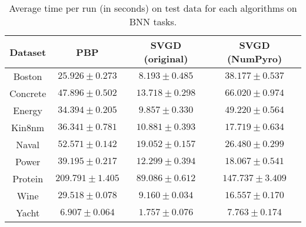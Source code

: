 \begin{table}[h]
\centering
\begin{tabular}{|c|ccc|}
\hline
 Dataset & PBP & SVGD (original) & SVGD (NumPyro)  \\
 \hline
Boston & $25.926 \pm 0.273$ & $8.193 \pm 0.485$ & $38.177 \pm 0.537$ \\
Concrete & $47.896 \pm 0.502$ & $13.718 \pm 0.298$ & $66.020 \pm 0.974$ \\
Energy & $34.394 \pm 0.205$ & $9.857 \pm 0.330$ & $49.220 \pm 0.564$ \\
Kin8nm & $36.341 \pm 0.781$ & $10.881 \pm 0.393$ & $17.719 \pm 0.634$ \\
Naval & $52.571 \pm 0.142$ & $19.052 \pm 0.157$ & $26.480 \pm 0.299$ \\
Power & $39.195 \pm 0.217$ & $12.299 \pm 0.394$ & $18.067 \pm 0.541$ \\
Protein & $209.791 \pm 1.405$ & $89.086 \pm 0.612$ & $147.737 \pm 3.409$ \\
Wine & $29.518 \pm 0.078$ & $9.160 \pm 0.034$ & $16.557 \pm 0.170$ \\
Yacht & $6.907 \pm 0.064$ & $1.757 \pm 0.076$ & $7.763 \pm 0.174$ \\
\hline
\end{tabular}
\caption{Average time per run (in seconds) on test data for each algorithms on BNN tasks.} 
\label{tab:bnn_time}
\end{table}